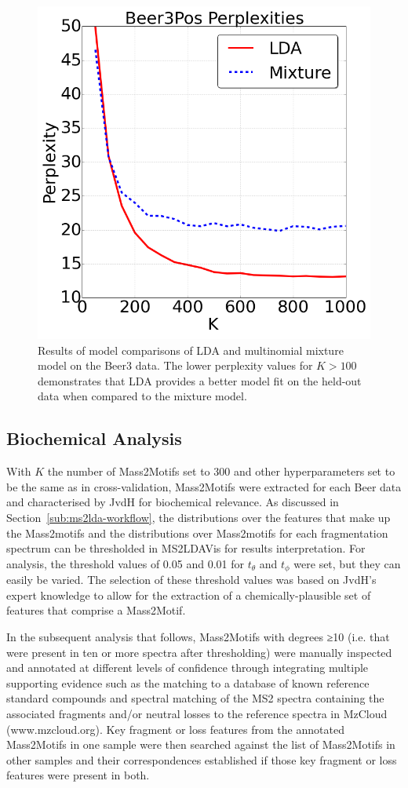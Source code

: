 \begin{figure}[!htbp]
\centering\includegraphics[width=0.5\linewidth]{07-lda/figures/perplexity.png}
\centering\caption[Results of model comparisons of LDA and multinomial mixture model on the Beer3 data.]{Results of model comparisons of LDA and multinomial mixture model on the Beer3 data. The lower perplexity values for $K>100$ demonstrates that LDA provides a better model fit on the held-out data when compared to the mixture model.\label{fig:m2lda-perplexity}}
\end{figure}

\subsection{Biochemical Analysis \label{sub:lda-biological-findings}}

With $K$ the number of Mass2Motifs set to 300 and other hyperparameters set to be the same as in cross-validation, Mass2Motifs were extracted for each Beer data and characterised by JvdH for biochemical relevance. As discussed in Section~\ref{sub:ms2lda-workflow}, the distributions over the features that make up the Mass2motifs and the distributions over Mass2motifs for each fragmentation spectrum can be thresholded in MS2LDAVis for results interpretation. For analysis, the threshold values of 0.05 and 0.01 for $t_{\theta}$ and $t_{\phi}$ were set, but they can easily be varied. The selection of these threshold values was based on JvdH's expert knowledge to allow for the extraction of a chemically-plausible set of features that comprise a Mass2Motif.

In the subsequent analysis that follows, Mass2Motifs with degrees ≥10 (i.e. that were present in ten or more spectra after thresholding) were manually inspected and annotated at different levels of confidence through integrating multiple supporting evidence such as the matching to a database of known reference standard compounds and spectral matching of the MS2 spectra containing the associated fragments and/or neutral losses to the reference spectra in MzCloud (www.mzcloud.org). Key fragment or loss features from the annotated Mass2Motifs in one sample were then searched against the list of Mass2Motifs in other samples and their correspondences established if those key fragment or loss features were present in both. 

